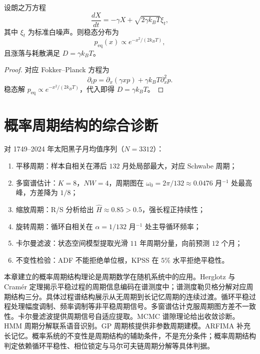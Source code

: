 \begin{theorem}[涨落--耗散定理的结构分解]\label{thm:fluctuation_dissipation_grammar}
设朗之万方程
\[
\frac{dX}{dt}=-\gamma X+\sqrt{2\gamma k_BT}\xi_t,
\]
其中 $\xi_t$ 为标准白噪声。则稳态分布为
\[
p_{\mathrm{eq}}(x)\propto e^{-x^2/(2k_BT)},
\]
且涨落与耗散满足 $D=\gamma k_BT$。
\end{theorem}

\begin{proof}
对应 Fokker--Planck 方程为
\[
\partial_tp=\partial_x(\gamma xp)+\gamma k_BT\partial_x^2p.
\]
稳态解 $p_{\mathrm{eq}}\propto e^{-x^2/(2k_BT)}$，代入即得 $D=\gamma k_BT$。
\end{proof}

\section{概率周期结构的综合诊断}
\label{sec:prob_final_diagnosis}

\begin{example}\label{ex:sunspot_diagnosis}
对 1749--2024 年太阳黑子月均值序列（$N=3312$）：
\begin{enumerate}[label=(\roman*)]
    \item 平移周期：样本自相关在滞后 $132$ 月处局部最大，对应 Schwabe 周期；
    \item 多窗谱估计：$K=8$，$NW=4$，周期图在 $\omega_0=2\pi/132\approx0.0476$ 月$^{-1}$ 处最高峰，方差降为 $1/8$；
    \item 缩放周期：R/S 分析给出 $\hat H\approx0.85>0.5$，强长程正持续性；
    \item 旋转周期：循环自相关在 $\alpha=1/132$ 月$^{-1}$ 处主导循环频率；
    \item 卡尔曼滤波：状态空间模型提取光滑 $11$ 年周期分量，向前预测 $12$ 个月；
    \item 不变性检验：ADF 不能拒绝单位根，KPSS 在 $5\%$ 水平拒绝平稳性。
\end{enumerate}
\end{example}

\begin{remark}[与全书的衔接]\label{rem:prob_book_interface}
本章建立的概率周期结构理论是周期数学在随机系统中的应用。Herglotz 与 Cramér 定理揭示平稳过程的周期信息编码在谱测度中；谱测度勒贝格分解对应周期结构三分。具体过程谱结构展示从无周期到长记忆周期的连续过渡。循环平稳过程处理幅度调制、频率调制等非平稳周期信号。多窗谱估计克服周期图方差不一致性。卡尔曼滤波提供周期信号自适应提取。MCMC 谱隙理论给出收敛诊断。HMM 周期分解联系语音识别。GP 周期核提供非参数周期建模。ARFIMA 补充长记忆。概率系统的不变性是周期结构的辅助条件，不是充分条件；概率周期结构判定依赖循环平稳性、相位锁定与马尔可夫链周期分解等具体判据。
\end{remark}

